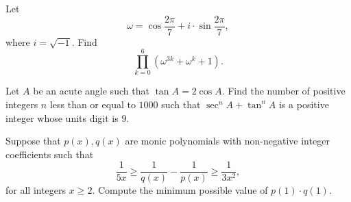 %	






\begin{question}[name={2023 AIME II, \href{https://artofproblemsolving.com/community/c4p27101186}{Problem 8}}]
	Let $$\omega=\cos\frac{2\pi}{7}+i\cdot\sin\frac{2\pi}{7},$$ where $i=\sqrt{-1}$. Find
	$$\prod_{k=0}^{6}(\omega^{3k}+\omega^k+1).$$
\end{question}




%	







\begin{question}[name={2023 AIME II, \href{https://artofproblemsolving.com/community/c4p27101686}{Problem 13}}]
	Let $A$ be an acute angle such that $\tan A = 2\cos A$. Find the number of positive integers $n$ less than or equal to $1000$ such that $\sec^n A + \tan^n A$ is a positive integer whose units digit is $9$.
\end{question}




%	





\begin{question}[name={2023 Stanford Math Tournament, \href{https://artofproblemsolving.com/community/c383h3065192p27653658}{Algebra \#10}}]
	Suppose that $p(x),q(x)$ are monic polynomials with non-negative integer coefficients such that
	\[\frac{1}{5x}\ge\frac{1}{q(x)}-\frac{1}{p(x)}\ge\frac{1}{3x^2},\]for all integers $x\ge2$. Compute the minimum possible value of $p(1)\cdot q(1)$.
\end{question}

